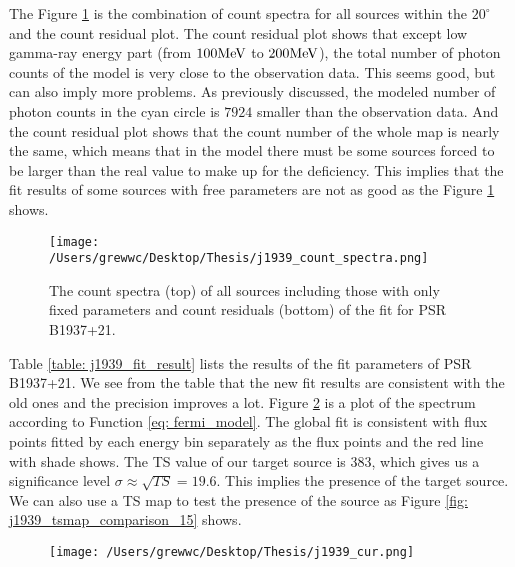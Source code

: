 \documentclass[12pt]{report}
\begin{document}
          The Figure \ref{fig: j1939_count_spectra} is the combination of count spectra for 
          all sources within the $20^{\circ}$ and the count residual plot. The count residual 
          plot shows that except low gamma-ray energy part (from $100\hbox{MeV}$ to 
          $200\hbox{MeV}$), the total number of photon counts of the model is very close to 
          the observation data. This seems good, but can also imply more problems. 
          As previously discussed, the modeled number of photon counts in the cyan circle 
          is $7924$ smaller than the observation data. And the count residual plot shows that 
          the count number of the whole map is nearly the same, which means that in the model
          there must be some sources forced to be larger than the real value to make up for 
          the deficiency. This implies that the fit results of some sources with free 
          parameters are not as good as the Figure \ref{fig: j1939_count_spectra} shows. 
          
          \begin{figure}[!ht]
            \centering
            \texttt{[image: /Users/grewwc/Desktop/Thesis/j1939\_count\_spectra.png]}
            \caption{The count spectra (top) of all sources including those with only fixed 
              parameters and count residuals (bottom) of the fit for PSR B1937+21.}
            \label{fig: j1939_count_spectra}
          \end{figure}

          Table \ref{table: j1939_fit_result} lists the results of the fit parameters of 
          PSR B1937+21. We see from the table that the new fit results are 
          consistent with the old ones and the precision improves a lot. 
          Figure \ref{fig: j1939_cur_with_data_points} is a plot of the spectrum 
          according to Function \ref{eq: fermi_model}.
          The global fit is consistent with flux points fitted by each energy bin separately 
          as the flux points and the red line with shade shows.  
          The TS value of our target source is $383$, which gives us 
          a significance level $\sigma \approx \sqrt{TS} = 19.6$. This implies the presence 
          of the target source. We can also use a TS map to test the presence of the source 
          as Figure \ref{fig: j1939_tsmap_comparison_15} shows. 
          
          \begin{figure}[!ht]
            \centering 
            \texttt{[image: /Users/grewwc/Desktop/Thesis/j1939\_cur.png]}
            \caption{}
            \label{fig: j1939_cur_with_data_points}
          \end{figure}
          
\end{document}
